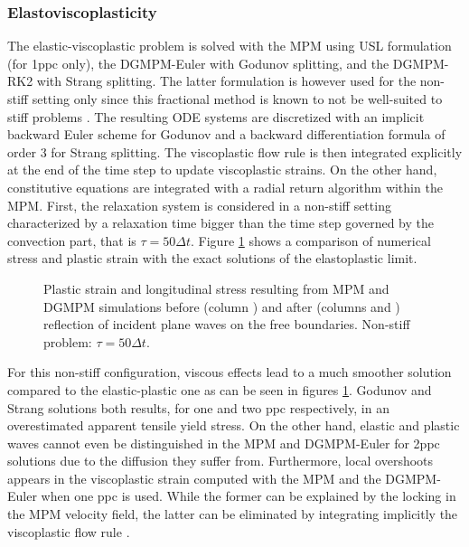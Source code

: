 \subsubsection{Elastoviscoplasticity}
The elastic-viscoplastic problem is solved with the MPM using USL formulation (for 1ppc only), the DGMPM-Euler with Godunov splitting, and the DGMPM-RK2 with Strang splitting. The latter formulation is however used for the non-stiff setting only since this fractional method is known to not be well-suited to stiff problems \cite{Leveque_stiff,Thomas_EVP}. The resulting ODE systems are discretized with an implicit backward Euler scheme for Godunov and a backward differentiation formula of order 3 for Strang splitting. The viscoplastic flow rule is then integrated explicitly at the end of the time step to update viscoplastic strains. On the other hand, constitutive equations are integrated with a radial return algorithm \cite{Simo} within the MPM. First, the relaxation system is considered in a non-stiff setting characterized by a relaxation time bigger than the time step governed by the convection part, that is $\tau=50\Delta t$. Figure \ref{fig:nonstiff_elastoviscoplastic_RP} shows a comparison of numerical stress and plastic strain with the exact solutions of the elastoplastic limit.
\begin{figure}[h!]
  \centering
  { \label{subfig:evp_nonstiff1}}
  { \label{subfig:evp_nonstiff2}}
  { \label{subfig:evp_nonstiff3}}
  {}
  \caption{Plastic strain and longitudinal stress resulting from MPM and DGMPM simulations before (column ) and after (columns  and ) reflection of incident plane waves on the free boundaries. Non-stiff problem: $\tau=50\Delta t$.}
  \label{fig:nonstiff_elastoviscoplastic_RP}
\end{figure}
For this non-stiff configuration, viscous effects lead to a much smoother solution compared to the elastic-plastic one as can be seen in figures \ref{fig:nonstiff_elastoviscoplastic_RP}. Godunov and Strang solutions both results, for one and two ppc respectively, in an overestimated apparent tensile yield stress. On the other hand, elastic and plastic waves cannot even be distinguished in the MPM and DGMPM-Euler for 2ppc solutions due to the diffusion they suffer from. Furthermore, local overshoots appears in the viscoplastic strain computed with the MPM and the DGMPM-Euler when one ppc is used. While the former can be explained by the locking in the MPM velocity field, the latter can be eliminated by integrating implicitly the viscoplastic flow rule \cite{Thomas_EVP}.


